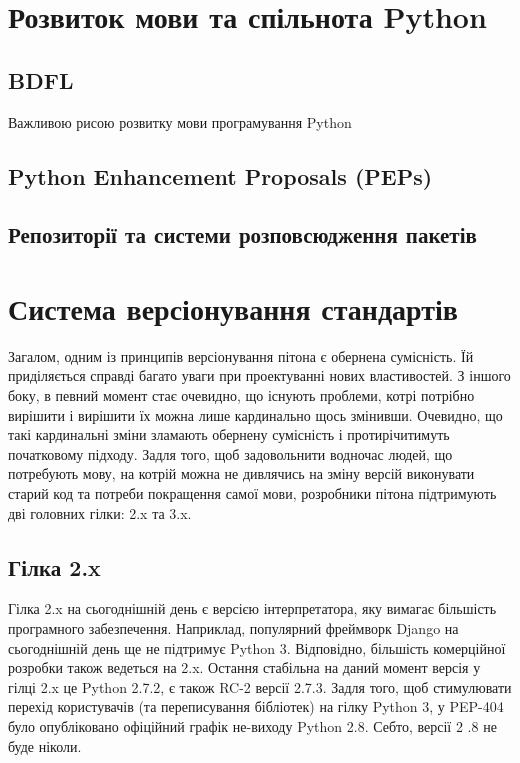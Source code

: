 \documentclass[a4paper, 12pt, onsedie]{article}
\begin{document}
\section{Розвиток мови та спільнота Python}

\subsection{BDFL}
    Важливою рисою розвитку мови програмування Python 

\subsection{Python Enhancement Proposals (PEPs)}

\subsection{Репозиторії та системи розповсюдження пакетів}

\section{Система версіонування стандартів}
Загалом, одним із принципів версіонування пітона є обернена сумісність. Їй приділяється 
справді багато уваги при проектуванні нових властивостей. З іншого боку, в певний момент 
стає очевидно, що існують проблеми, котрі потрібно вирішити і вирішити їх можна лише 
кардинально щось змінивши. Очевидно, що такі кардинальні зміни зламають обернену сумісність
і протирічитимуть початковому підходу. Задля того, щоб задовольнити водночас людей, що 
потребують мову, на котрій можна не дивлячись на зміну версій виконувати старий код та 
потреби покращення самої мови, розробники пітона підтримують дві головних гілки: 2.x та 3.x.


\subsection{Гілка 2.x}
Гілка 2.x на сьогоднішній день є версією інтерпретатора, яку вимагає більшість програмного
забезпечення. Наприклад, популярний фреймворк Django на сьогоднішній день ще не підтримує
Python 3. Відповідно, більшість комерційної розробки також ведеться на 2.x.
Остання стабільна на даний момент версія у гілці 2.x це Python 2.7.2, є також RC-2 версії 2.7.3.
Задля того, щоб стимулювати перехід користувачів (та переписування бібліотек) на гілку 
Python 3, у PEP-404 було опубліковано офіційний графік не-виходу Python 2.8. Себто, версії 2
.8 не буде ніколи. 
\end{document}
